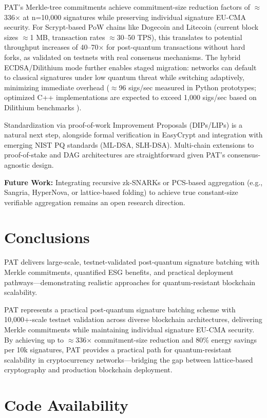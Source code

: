 \documentclass[iacr,final]{iacrtrans}
\begin{document}
PAT's Merkle-tree commitments achieve commitment-size reduction factors of $\approx$336$\times$ at n=10,000 signatures while preserving individual signature EU-CMA security. For Scrypt-based PoW chains like Dogecoin and Litecoin (current block sizes $\approx$1 MB, transaction rates $\approx$30--50 TPS), this translates to potential throughput increases of 40--70$\times$ for post-quantum transactions without hard forks, as validated on testnets with real consensus mechanisms. The hybrid ECDSA/Dilithium mode further enables staged migration: networks can default to classical signatures under low quantum threat while switching adaptively, minimizing immediate overhead ($\approx$96 sigs/sec measured in Python prototypes; optimized C++ implementations are expected to exceed 1,000 sigs/sec based on Dilithium benchmarks \cite{dilithium}).

Standardization via proof-of-work Improvement Proposals (DIPs/LIPs) is a natural next step, alongside formal verification in EasyCrypt and integration with emerging NIST PQ standards (ML-DSA, SLH-DSA). Multi-chain extensions to proof-of-stake and DAG architectures are straightforward given PAT's consensus-agnostic design.

\textbf{Future Work:} Integrating recursive zk-SNARKs or PCS-based aggregation (e.g., Sangria, HyperNova, or lattice-based folding) to achieve true constant-size verifiable aggregation remains an open research direction.
\section{Conclusions}
\label{sec:conclusions}

PAT delivers large-scale, testnet-validated post-quantum signature batching with Merkle commitments, quantified ESG benefits, and practical deployment pathways---demonstrating realistic approaches for quantum-resistant blockchain scalability.

PAT represents a practical post-quantum signature batching scheme with 10,000+-scale testnet validation across diverse blockchain architectures, delivering Merkle commitments while maintaining individual signature EU-CMA security. By achieving up to $\approx$336$\times$ commitment-size reduction and 80\% energy savings per 10k signatures, PAT provides a practical path for quantum-resistant scalability in cryptocurrency networks---bridging the gap between lattice-based cryptography and production blockchain deployment.
\section{Code Availability}
\label{sec:code}
\end{document}
